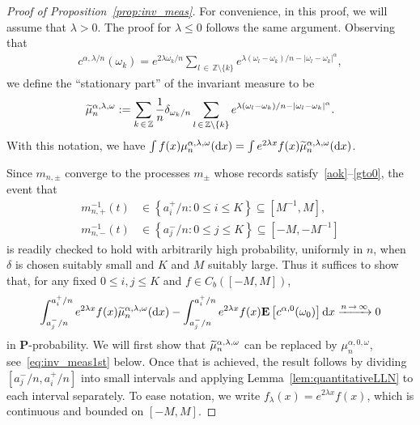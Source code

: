 \documentclass[10pt]{amsart}
\theoremstyle{definition}\newtheorem{defi}[theo]{Definition}\newtheorem{rema}[theo]{Remark}\newtheorem{exam}[theo]{Example}\newtheorem{exem}[theo]{Example}\newtheorem{nota}[theo]{Notation}
\newcommand{\Z}{\mathbb Z}
\newcommand{\bfP}{\mathbf{P}}
\newcommand{\bfE}{\mathbf{E}}
\newcommand{\dd}{\text{\upshape{d}}}
\let\oldtilde\tilde
\renewcommand*{\tilde}[1]{\mathchoice{\widetilde{#1}}{\widetilde{#1}}{\oldtilde{#1}}{\oldtilde{#1}}}
\begin{document}
\begin{proof}[Proof of Proposition~\ref{prop:inv_meas}]
For convenience, in this proof, we will assume that $\lambda>0$. The proof for $\lambda\leq 0$ follows the same argument. Observing that
\begin{align*}
c^{\alpha,\lambda/n}(\omega_k)=e^{2\lambda\omega_k/n}\sum_{l\,\in\,\Z\setminus\{k\}}e^{\lambda\left(\omega_l-\omega_k\right)/n-\left|\omega_l-\omega_k\right|^\alpha},
\end{align*}
we define the ``stationary part'' of the invariant measure to be
\begin{align*}
\tilde{\mu}^{\alpha,\lambda,\omega}_n:=\sum_{k\,\in\,\Z}\frac{1}{n}\delta_{\omega_k/n}\sum_{l\,\in\,\Z\setminus\{k\}}e^{\lambda(\omega_l-\omega_k)/n-|\omega_l-\omega_k|^\alpha}.
\end{align*}
With this notation, we have $\int f(x) \mu^{\alpha,\lambda,\omega}_n(\dd x)=\int e^{2\lambda x}f(x) \tilde{\mu}^{\alpha,\lambda,\omega}_n(\dd x)$.

Since $m_{n,\pm}$ converge to the processes $m_\pm$ whose records satisfy~\eqref{aok}--\eqref{gto0}, the event that
\begin{align*}
m_{n,+}^{-1}(t)&\in \left\{a_i^+/n\colon 0\le i \le K\right\} \subseteq \left[M^{-1}, M\right],\\
m_{n,-}^{-1}(t)&\in \left\{a_j^-/n\colon 0\le j \le K\right\} \subseteq \left[-M,-M^{-1}\right]
\end{align*}
is readily checked to hold with arbitrarily high probability, uniformly in $n$, when $\delta$ is chosen suitably small and $K$ and $M$ suitably large. Thus it suffices to show that, for any fixed $0\le i,j \le K$ and $f\in C_b([-M,M])$,
\begin{align}\label{eq:meas_goal}
\int_{a_j^-/n}^{a_i^+/n}e^{2\lambda x}f(x)\tilde{\mu}_n^{\alpha,\lambda,\omega}(\dd x)-
\int_{a_j^-/n}^{a_i^+/n}e^{2\lambda x}f(x)\bfE\left[c^{\alpha,0}(\omega_0)\right]\dd x \xrightarrow{n\,\to\,\infty} 0
\end{align}
in $\bfP$-probability. We will first show that $\tilde\mu_n^{\alpha,\lambda,\omega}$ can be replaced by $\mu_n^{\alpha,0,\omega}$, see~\eqref{eq:inv_meas1st} below. Once that is achieved, the result follows by dividing $[a_j^-/n,a_i^+/n]$ into small intervals and applying Lemma~\ref{lem:quantitativeLLN} to each interval separately. To ease notation, we write $f_\lambda(x)=e^{2\lambda x}f(x)$, which is continuous and bounded on $[-M,M]$.


\end{proof}
\end{document}

